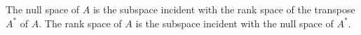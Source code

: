 The null space of $A$ is the subspace incident with the rank space of the transpose $A^*$ of $A$. The rank space of $A$ is the subspace incident with the null space of $A^*$.
